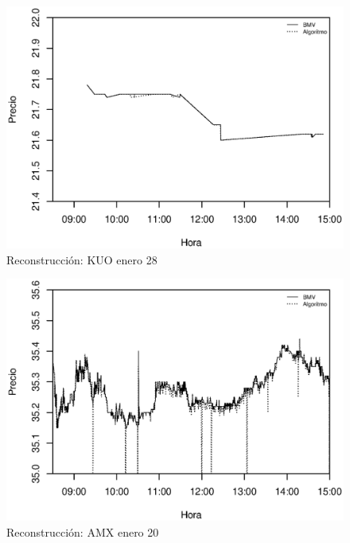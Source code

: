 \documentclass[11pt]{article}
\numberwithin{equation}{section} %
\begin{document}
\begin{figure}[htbp] \centering
\includegraphics[scale=0.75, trim=0 0.5cm 0 1.5cm]{kuo012811.eps}
\caption{Reconstrucción: KUO enero 28}
\label{kuo0128}
\end{figure}

\begin{figure}[htbp] \centering
\includegraphics[scale=0.75, trim=0 0.5cm 0 1.5cm]{amx012011.eps}
\caption{Reconstrucción: AMX enero 20}
\label{amx0120}
\end{figure}
\end{document}
